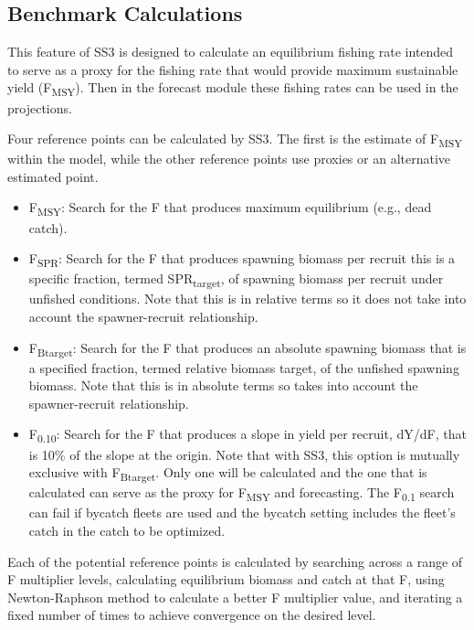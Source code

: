 \hypertarget{Benchmark}{}
\subsection{Benchmark Calculations}
This feature of SS3 is designed to calculate an equilibrium fishing rate intended to serve as a proxy for the fishing rate that would provide maximum sustainable yield (F\textsubscript{MSY}).  Then in the forecast module these fishing rates can be used in the projections.

Four reference points can be calculated by SS3. The first is the estimate of F\textsubscript{MSY} within the model, while the other reference points use proxies or an alternative estimated point.

\begin{itemize}
	\item F\textsubscript{MSY}: Search for the F that produces maximum equilibrium (e.g., dead catch).
	
	\item F\textsubscript{SPR}: Search for the F that produces spawning biomass per recruit this is a specific fraction, termed SPR\textsubscript{target}, of spawning biomass per recruit under unfished conditions. Note that this is in relative terms so it does not take into account the spawner-recruit relationship.
	
	\item F\textsubscript{Btarget}: Search for the F that produces an absolute spawning biomass that is a specified fraction, termed relative biomass target, of the unfished spawning biomass. Note that this is in absolute terms so takes into account the spawner-recruit relationship. 
	
	\item F\textsubscript{0.10}: Search for the F that produces a slope in yield per recruit, dY/dF, that is 10\% of the slope at the origin. Note that with SS3, this option is mutually exclusive with F\textsubscript{Btarget}. Only one will be calculated and the one that is calculated can serve as the proxy for F\textsubscript{MSY} and forecasting. The F\textsubscript{0.1} search can fail if bycatch fleets are used and the bycatch setting includes the fleet's catch in the catch to be optimized.
\end{itemize}

Each of the potential reference points is calculated by searching across a range of F multiplier levels, calculating equilibrium biomass and catch at that F, using Newton-Raphson method to calculate a better F multiplier value, and iterating a fixed number of times to achieve convergence on the desired level.

